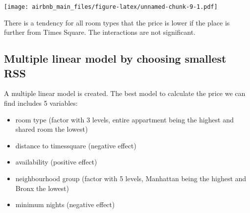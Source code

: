 \documentclass[]{article}
\providecommand{\tightlist}{%
  \setlength{\itemsep}{0pt}\setlength{\parskip}{0pt}}
\begin{document}
\texttt{[image: airbnb\_main\_files/figure-latex/unnamed-chunk-9-1.pdf]}

There is a tendency for all room types that the price is lower if the
place is further from Times Square. The interactions are not
significant.

\hypertarget{multiple-linear-model-by-choosing-smallest-rss}{%
\subsection{Multiple linear model by choosing smallest
RSS}\label{multiple-linear-model-by-choosing-smallest-rss}}

A multiple linear model is created. The best model to calculate the
price we can find includes 5 variables:

\begin{itemize}
\tightlist
\item
  room type (factor with 3 levels, entire appartment being the highest
  and shared room the lowest)
\item
  distance to timessquare (negative effect)
\item
  availability (positive effect)
\item
  neighbourhood group (factor with 5 levels, Manhattan being the highest
  and Bronx the lowest)
\item
  minimum nights (negative effect)
\end{itemize}
\end{document}
